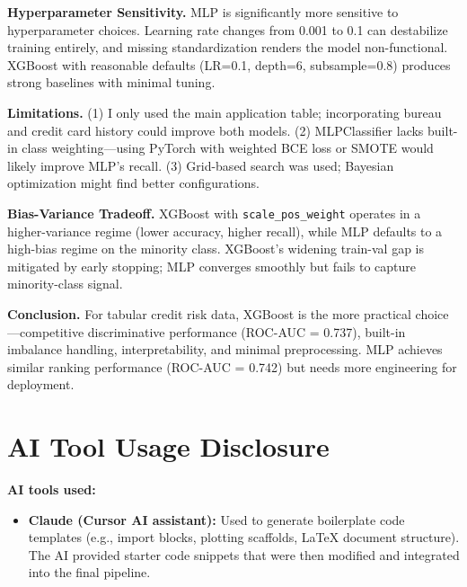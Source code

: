 \documentclass[11pt, letterpaper]{article}
\begin{document}
\textbf{Hyperparameter Sensitivity.} MLP is significantly more sensitive to hyperparameter choices. Learning rate changes from 0.001 to 0.1 can destabilize training entirely, and missing standardization renders the model non-functional. XGBoost with reasonable defaults (LR=0.1, depth=6, subsample=0.8) produces strong baselines with minimal tuning.

\textbf{Limitations.} (1) I only used the main application table; incorporating bureau and credit card history could improve both models. (2) MLPClassifier lacks built-in class weighting---using PyTorch with weighted BCE loss or SMOTE would likely improve MLP's recall. (3) Grid-based search was used; Bayesian optimization might find better configurations.

\textbf{Bias-Variance Tradeoff.} XGBoost with \texttt{scale\_pos\_weight} operates in a higher-variance regime (lower accuracy, higher recall), while MLP defaults to a high-bias regime on the minority class. XGBoost's widening train-val gap is mitigated by early stopping; MLP converges smoothly but fails to capture minority-class signal.

\textbf{Conclusion.} For tabular credit risk data, XGBoost is the more practical choice---competitive discriminative performance (ROC-AUC = 0.737), built-in imbalance handling, interpretability, and minimal preprocessing. MLP achieves similar ranking performance (ROC-AUC = 0.742) but needs more engineering for deployment.

\section*{AI Tool Usage Disclosure}

\textbf{AI tools used:}
\begin{itemize}[nosep]
    \item \textbf{Claude (Cursor AI assistant):} Used to generate boilerplate code templates (e.g., import blocks, plotting scaffolds, LaTeX document structure). The AI provided starter code snippets that were then modified and integrated into the final pipeline.
\end{itemize}
\end{document}
